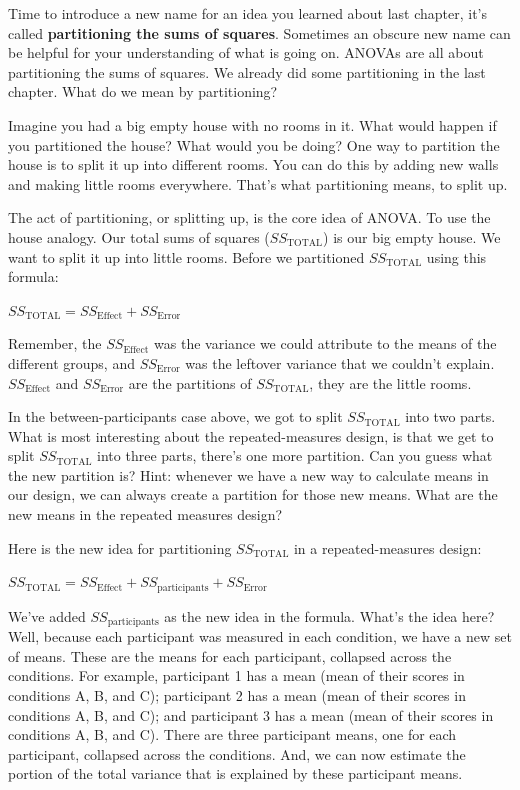 \documentclass[
]{book}
\begin{document}
Time to introduce a new name for an idea you learned about last chapter, it's called \textbf{partitioning the sums of squares}. Sometimes an obscure new name can be helpful for your understanding of what is going on. ANOVAs are all about partitioning the sums of squares. We already did some partitioning in the last chapter. What do we mean by partitioning?

Imagine you had a big empty house with no rooms in it. What would happen if you partitioned the house? What would you be doing? One way to partition the house is to split it up into different rooms. You can do this by adding new walls and making little rooms everywhere. That's what partitioning means, to split up.

The act of partitioning, or splitting up, is the core idea of ANOVA. To use the house analogy. Our total sums of squares (\(SS_\text{TOTAL}\)) is our big empty house. We want to split it up into little rooms. Before we partitioned \(SS_\text{TOTAL}\) using this formula:

\(SS_\text{TOTAL} = SS_\text{Effect} + SS_\text{Error}\)

Remember, the \(SS_\text{Effect}\) was the variance we could attribute to the means of the different groups, and \(SS_\text{Error}\) was the leftover variance that we couldn't explain. \(SS_\text{Effect}\) and \(SS_\text{Error}\) are the partitions of \(SS_\text{TOTAL}\), they are the little rooms.

In the between-participants case above, we got to split \(SS_\text{TOTAL}\) into two parts. What is most interesting about the repeated-measures design, is that we get to split \(SS_\text{TOTAL}\) into three parts, there's one more partition. Can you guess what the new partition is? Hint: whenever we have a new way to calculate means in our design, we can always create a partition for those new means. What are the new means in the repeated measures design?

Here is the new idea for partitioning \(SS_\text{TOTAL}\) in a repeated-measures design:

\(SS_\text{TOTAL} = SS_\text{Effect} + SS_\text{participants} +SS_\text{Error}\)

We've added \(SS_\text{participants}\) as the new idea in the formula. What's the idea here? Well, because each participant was measured in each condition, we have a new set of means. These are the means for each participant, collapsed across the conditions. For example, participant 1 has a mean (mean of their scores in conditions A, B, and C); participant 2 has a mean (mean of their scores in conditions A, B, and C); and participant 3 has a mean (mean of their scores in conditions A, B, and C). There are three participant means, one for each participant, collapsed across the conditions. And, we can now estimate the portion of the total variance that is explained by these participant means.
\end{document}
